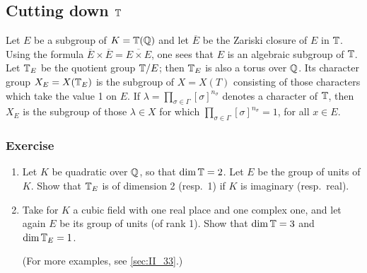 \subsection{Cutting down $\mathbb{T}$}
\label{sec:II_12}
Let $E$ be a subgroup of $K = \mathbb{T}(\mathbb{Q})$ and let $\overline{E}$ be the Zariski
closure of $E$ in $\mathbb{T}$. Using the formula $\overline{E} \times \overline{E} =
\overline{E \times E}$, one sees that $E$ is an algebraic subgroup of $\mathbb{T}$.
Let $\mathbb{T}_E$ be the quotient group $\mathbb{T}/E$; then $\mathbb{T}_E$ is also a torus over
$\mathbb{Q}$. Its character group $X_E = X(\mathbb{T}_E)$ is the subgroup of $X = X(T)$
consisting of those characters which take the value 1 on $E$.
If $\lambda = \prod_{\sigma \in \Gamma} [\sigma]^{n_\sigma}$ denotes a
character of $\mathbb{T}$, then $X_E$ is the subgroup of those $\lambda \in X$ for 
which
$\prod_{\sigma \in \Gamma} [\sigma]^{n_\sigma} = 1$, for all $x \in E$.

\subsubsection*{Exercise}
\begin{enumerate}[label=\textit{\alph*}.]
\item Let $K$ be quadratic over $\mathbb{Q}$, so that $\dim \mathbb{T} = 2$. Let $E$ be the
	group of units of $K$. Show that $\mathbb{T}_E$ is of dimension 2 (resp.\ 1) if
	$K$ is imaginary (resp.\ real).
\item Take for $K$ a cubic field with one real place and one complex one, and
	let again $E$ be its group of units (of rank 1). Show that $\dim \mathbb{T} = 3$
	and $\dim \mathbb{T}_E = 1$.

	(For more examples, see \ref{sec:II_33}.)\dpage
\end{enumerate}

